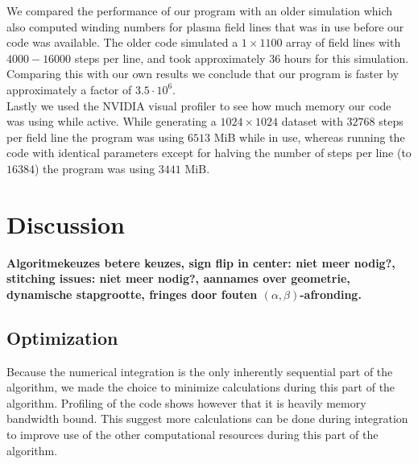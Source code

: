 \documentclass{article}
\begin{document}
We compared the performance of our program with an older simulation which also computed winding numbers for plasma field lines that was in use before our code was available. The older code simulated a $1\times 1100$ array of field lines with $4000-16000$ steps per line, and took approximately $36$ hours for this simulation. Comparing this with our own results we conclude that our program is faster by approximately a factor of $3.5\cdot 10^6$.\\

Lastly we used the NVIDIA visual profiler to see how much memory our code was using while active. While generating a $1024\times 1024$ dataset with $32768$ steps per field line the program was using $6513$ MiB while in use, whereas running the code with identical parameters except for halving the number of steps per line (to $16384$) the program was using $3441$ MiB.


\section{Discussion}
{\bf Algoritmekeuzes \textrightarrow betere keuzes, sign flip in center: niet meer nodig?, stitching issues: niet meer nodig?, aannames over geometrie, dynamische stapgrootte, fringes door fouten $(\alpha,\beta)$-afronding.}\\

\subsection{Optimization}
Because the numerical integration is the only inherently sequential part of the algorithm, we made the choice to minimize calculations during this part of the algorithm. Profiling of the code shows however that it is heavily memory bandwidth bound. This suggest more calculations can be done during integration to improve use of the other computational resources during this part of the algorithm.\\
\end{document}
